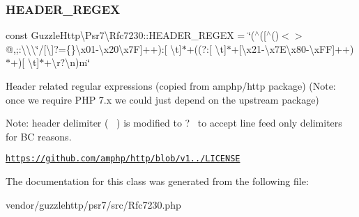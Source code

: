 \subsubsection{\texorpdfstring{H\+E\+A\+D\+E\+R\+\_\+\+R\+E\+G\+EX}{HEADER\_REGEX}}
{\footnotesize\ttfamily const Guzzle\+Http\textbackslash{}\+Psr7\textbackslash{}\+Rfc7230\+::\+H\+E\+A\+D\+E\+R\+\_\+\+R\+E\+G\+EX = \char`\"{}($^\wedge$(\mbox{[}$^\wedge$()$<$$>$@,;\+:\textbackslash{}\textbackslash{}\textbackslash{}\char`\"{}/\mbox{[}\textbackslash{}\mbox{]}?=\{\}\textbackslash{}x01-\/\textbackslash{}x20\textbackslash{}x7F\mbox{]}++)\+:\mbox{[} \textbackslash{}t\mbox{]}$\ast$+((?\+:\mbox{[} \textbackslash{}t\mbox{]}$\ast$+\mbox{[}\textbackslash{}x21-\/\textbackslash{}x7\+E\textbackslash{}x80-\/\textbackslash{}x\+FF\mbox{]}++)$\ast$+)\mbox{[} \textbackslash{}t\mbox{]}$\ast$+\textbackslash{}r?\textbackslash{}n)m\char`\"{}}

Header related regular expressions (copied from amphp/http package) (Note\+: once we require P\+HP 7.\+x we could just depend on the upstream package)

Note\+: header delimiter (~\newline
) is modified to ?~\newline
 to accept line feed only delimiters for BC reasons.

\hyperlink{}{\href{https://github.com/amphp/http/blob/v1.0.1/LICENSE}{\tt https\+://github.\+com/amphp/http/blob/v1../\+L\+I\+C\+E\+N\+SE} }

The documentation for this class was generated from the following file\+:\begin{DoxyCompactItemize}
\item 
vendor/guzzlehttp/psr7/src/Rfc7230.\+php\end{DoxyCompactItemize}
